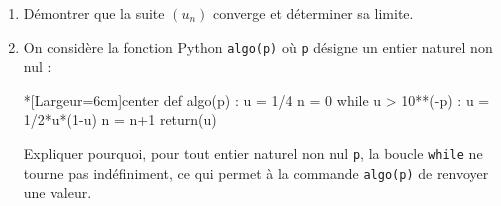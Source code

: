 \begin{enumerate}
	\item Démontrer que la suite $\left(u_n\right)$ converge et déterminer sa limite.
	\item On considère la fonction \textsf{Python} \texttt{algo(p)} où \texttt{p} désigne un entier naturel non nul :
	
\begin{CodePythonLstAlt}*[Largeur=6cm]{center}
def algo(p) :
	u = 1/4
	n = 0
	while u > 10**(-p) :
		u = 1/2*u*(1-u)
		n = n+1
	return(u)
\end{CodePythonLstAlt}

	Expliquer pourquoi, pour tout entier naturel non nul \texttt{p}, la boucle \texttt{while} ne tourne pas indéfiniment, ce qui permet à la commande \texttt{algo(p)} de renvoyer une valeur.
\end{enumerate}

